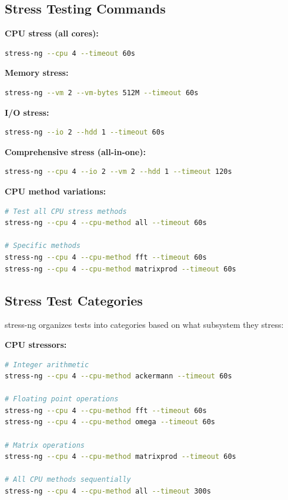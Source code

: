 \documentclass[12pt,a4paper]{report}
\begin{document}
\subsection{Stress Testing Commands}

\textbf{CPU stress (all cores):}
\begin{lstlisting}[language=bash]
stress-ng --cpu 4 --timeout 60s
\end{lstlisting}

\textbf{Memory stress:}
\begin{lstlisting}[language=bash]
stress-ng --vm 2 --vm-bytes 512M --timeout 60s
\end{lstlisting}

\textbf{I/O stress:}
\begin{lstlisting}[language=bash]
stress-ng --io 2 --hdd 1 --timeout 60s
\end{lstlisting}

\textbf{Comprehensive stress (all-in-one):}
\begin{lstlisting}[language=bash]
stress-ng --cpu 4 --io 2 --vm 2 --hdd 1 --timeout 120s
\end{lstlisting}

\textbf{CPU method variations:}
\begin{lstlisting}[language=bash]
# Test all CPU stress methods
stress-ng --cpu 4 --cpu-method all --timeout 60s

# Specific methods
stress-ng --cpu 4 --cpu-method fft --timeout 60s
stress-ng --cpu 4 --cpu-method matrixprod --timeout 60s
\end{lstlisting}

\subsection{Stress Test Categories}

stress-ng organizes tests into categories based on what subsystem they stress:

\textbf{CPU stressors:}
\begin{lstlisting}[language=bash]
# Integer arithmetic
stress-ng --cpu 4 --cpu-method ackermann --timeout 60s

# Floating point operations
stress-ng --cpu 4 --cpu-method fft --timeout 60s
stress-ng --cpu 4 --cpu-method omega --timeout 60s

# Matrix operations
stress-ng --cpu 4 --cpu-method matrixprod --timeout 60s

# All CPU methods sequentially
stress-ng --cpu 4 --cpu-method all --timeout 300s
\end{lstlisting}
\end{document}
